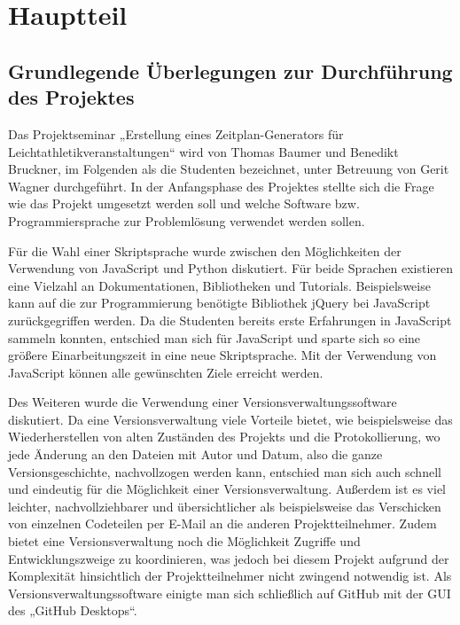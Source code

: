 
\chapter{Hauptteil}
\label{chap:Hauptteil}

\section{Grundlegende Überlegungen zur Durchführung des Projektes}
Das Projektseminar „Erstellung eines Zeitplan-Generators für Leichtathletikveranstaltungen“ wird von Thomas Baumer und Benedikt Bruckner, im Folgenden als die Studenten bezeichnet, unter Betreuung von Gerit Wagner durchgeführt. In der Anfangsphase des Projektes stellte sich die Frage wie das Projekt umgesetzt werden soll und welche Software bzw. Programmiersprache zur Problemlösung verwendet werden sollen. 

Für die Wahl einer Skriptsprache wurde zwischen den Möglichkeiten der Verwendung von JavaScript und Python diskutiert. Für beide Sprachen existieren eine Vielzahl an Dokumentationen, Bibliotheken und Tutorials. Beispielsweise kann auf die zur Programmierung benötigte Bibliothek jQuery bei JavaScript zurückgegriffen werden. Da die Studenten bereits erste Erfahrungen in JavaScript sammeln konnten, entschied man sich für JavaScript und sparte sich so eine größere Einarbeitungszeit in eine neue Skriptsprache. Mit der Verwendung von JavaScript können alle gewünschten Ziele erreicht werden.

Des Weiteren wurde die Verwendung einer Versionsverwaltungssoftware diskutiert. Da eine Versionsverwaltung viele Vorteile bietet, wie beispielsweise das Wiederherstellen von alten Zuständen des Projekts und die Protokollierung, wo jede Änderung an den Dateien mit Autor und Datum, also die ganze Versionsgeschichte, nachvollzogen werden kann, entschied man sich auch schnell und eindeutig für die Möglichkeit einer Versionsverwaltung. Außerdem ist es viel leichter, nachvollziehbarer und übersichtlicher als beispielsweise das Verschicken von einzelnen Codeteilen per E-Mail an die anderen Projektteilnehmer. Zudem bietet eine Versionsverwaltung noch die Möglichkeit Zugriffe und Entwicklungszweige zu koordinieren, was jedoch bei diesem Projekt aufgrund der Komplexität hinsichtlich der Projektteilnehmer nicht zwingend notwendig ist.
Als Versionsverwaltungssoftware einigte man sich schließlich auf GitHub mit der \ac{GUI} des „GitHub Desktops“.  

